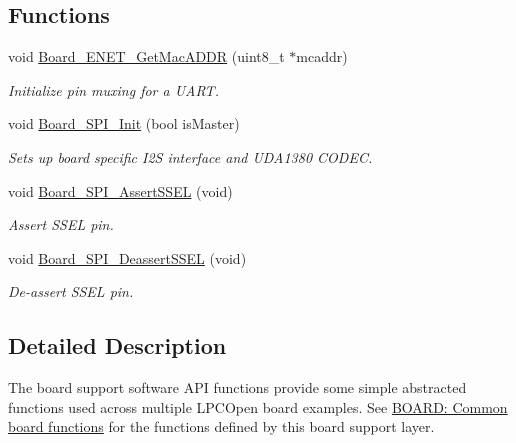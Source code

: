 \subsection*{Functions}
\begin{DoxyCompactItemize}
\item 
void \hyperlink{group___b_o_a_r_d___n_x_p___l_p_c_x_p_r_e_s_s_o__1769_ga4e21ba86f42bc4dd53b704a81d923e1d}{Board\+\_\+\+E\+N\+E\+T\+\_\+\+Get\+Mac\+A\+D\+D\+R} (uint8\+\_\+t $\ast$mcaddr)
\begin{DoxyCompactList}\small\item\em Initialize pin muxing for a U\+A\+R\+T. \end{DoxyCompactList}\item 
void \hyperlink{group___b_o_a_r_d___n_x_p___l_p_c_x_p_r_e_s_s_o__1769_gab66dcfba1eb46b0381496cd964ca63f7}{Board\+\_\+\+S\+P\+I\+\_\+\+Init} (bool is\+Master)
\begin{DoxyCompactList}\small\item\em Sets up board specific I2\+S interface and U\+D\+A1380 C\+O\+D\+E\+C. \end{DoxyCompactList}\item 
void \hyperlink{group___b_o_a_r_d___n_x_p___l_p_c_x_p_r_e_s_s_o__1769_gaa73156d23e5434d549d22864e8b7be13}{Board\+\_\+\+S\+P\+I\+\_\+\+Assert\+S\+S\+E\+L} (void)
\begin{DoxyCompactList}\small\item\em Assert S\+S\+E\+L pin. \end{DoxyCompactList}\item 
void \hyperlink{group___b_o_a_r_d___n_x_p___l_p_c_x_p_r_e_s_s_o__1769_ga3824a7f09cbb5db96f33cc36b08592ed}{Board\+\_\+\+S\+P\+I\+\_\+\+Deassert\+S\+S\+E\+L} (void)
\begin{DoxyCompactList}\small\item\em De-\/assert S\+S\+E\+L pin. \end{DoxyCompactList}\end{DoxyCompactItemize}


\subsection{Detailed Description}
The board support software A\+P\+I functions provide some simple abstracted functions used across multiple L\+P\+C\+Open board examples. See \hyperlink{group___b_o_a_r_d___c_o_m_m_o_n___a_p_i}{B\+O\+A\+R\+D\+: Common board functions} for the functions defined by this board support layer.~\newline
 

